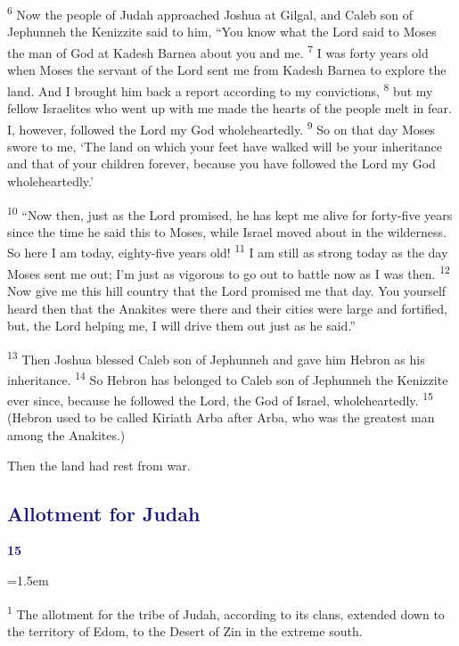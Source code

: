 \documentclass[12pt,twoside]{article}
\newcommand{\vs}[1]{\textsuperscript{#1}}
\newcommand{\chapterWithBigIndent}[2]{%
  \noindent
  \begin{minipage}[t]{1cm}
    \vspace{-0.4\baselineskip}
    {\textcolor{MidnightBlue}{\fontsize{40pt}{48pt}\selectfont \textbf{#1}}}
  \end{minipage}%
  \hspace{0.9cm}%
  \begin{minipage}[t]{\dimexpr\linewidth - 1.5cm - 0.3cm\relax}
    \hangindent=1.5em
    \hangafter=3
    #2
    \vspace{0.05cm}
  \end{minipage}
}
\begin{document}
\indent \indent \vs{6} Now the people of Judah approached Joshua at Gilgal, and Caleb son of Jephunneh the Kenizzite said to him, ``You know what the Lord said to Moses the man of God at Kadesh Barnea about you and me.
\vs{7} I was forty years old when Moses the servant of the Lord sent me from Kadesh Barnea to explore the land. And I brought him back a report according to my convictions,
\vs{8} but my fellow Israelites who went up with me made the hearts of the people melt in fear. I, however, followed the Lord my God wholeheartedly.
\vs{9} So on that day Moses swore to me, `The land on which your feet have walked will be your inheritance and that of your children forever, because you have followed the Lord my God wholeheartedly.'

\vs{10} ``Now then, just as the Lord promised, he has kept me alive for forty-five years since the time he said this to Moses, while Israel moved about in the wilderness. So here I am today, eighty-five years old!
\vs{11} I am still as strong today as the day Moses sent me out; I'm just as vigorous to go out to battle now as I was then.
\vs{12} Now give me this hill country that the Lord promised me that day. You yourself heard then that the Anakites were there and their cities were large and fortified, but, the Lord helping me, I will drive them out just as he said.''

\vs{13} Then Joshua blessed Caleb son of Jephunneh and gave him Hebron as his inheritance.
\vs{14} So Hebron has belonged to Caleb son of Jephunneh the Kenizzite ever since, because he followed the Lord, the God of Israel, wholeheartedly.
\vs{15} (Hebron used to be called Kiriath Arba after Arba, who was the greatest man among the Anakites.)

Then the land had rest from war.

\subsection*{\textcolor{MidnightBlue}{\textbf{Allotment for Judah}}}

\chapterWithBigIndent{15}{
  \vs{1} The allotment for the tribe of Judah, according to its clans, extended down to the territory of Edom, to the Desert of Zin in the extreme south.\vspace{0.3cm}
}
\end{document}
